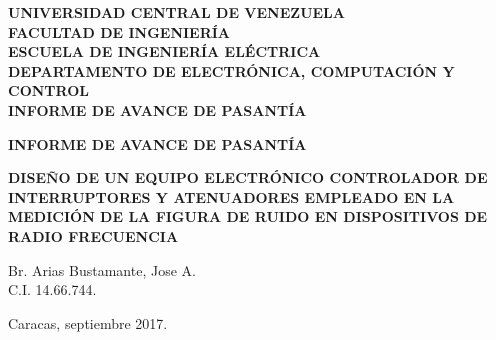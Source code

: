 \documentclass[paper=letter,oneside,fontsize=12pt, parskip=full]{article}
\begin{document}
		
		
			
		\begin{titlepage}
		
		\begin{center}		
			
			\begin{large}							
				\bfseries
				\uppercase{Universidad Central de Venezuela} \\			
				\uppercase{Facultad de Ingeniería} \\							
				\uppercase{Escuela de Ingeniería Eléctrica} \\
        		\uppercase{Departamento de Electrónica, Computación y Control} \\
        		\uppercase{Informe de Avance de Pasantía}          	
			\end{large}			
		
			\vfill
			
			\begin{large}
				\bfseries
				\uppercase{Informe de Avance de Pasantía}
			\end{large}
		
			\vspace{2mm}
			
			\begin{Large}
				\begin{spacing}{1.2}
					\bfseries				
		      		\uppercase{Diseño de un equipo electrónico controlador de interruptores y atenuadores empleado en la medición de la figura de ruido en dispositivos de radio frecuencia}	
		      	\end{spacing}
			\end{Large}					
			
			\vfill
			
			\begin{flushright}
				Br. Arias Bustamante, Jose A. \\
				C.I. 14.66.744.
			\end{flushright}
		
			\vfill
			
			\begin{center}
				Caracas, septiembre 2017.
			\end{center}
		
		\end{center}
	
	\end{titlepage}
	
\end{document}
